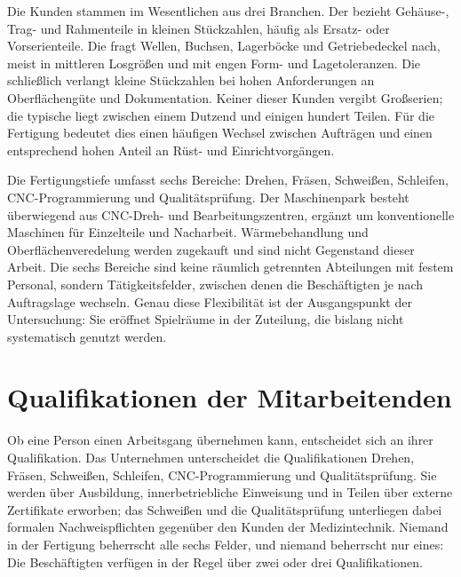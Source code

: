 Die Kunden stammen im Wesentlichen aus drei Branchen. Der 
bezieht Gehäuse-, Trag- und Rahmenteile in kleinen Stückzahlen, häufig als
Ersatz- oder Vorserienteile. Die  fragt Wellen,
Buchsen, Lagerböcke und Getriebedeckel nach, meist in mittleren Losgrößen und
mit engen Form- und Lagetoleranzen. Die  schließlich
verlangt kleine Stückzahlen bei hohen Anforderungen an Oberflächengüte und
Dokumentation. Keiner dieser Kunden vergibt Großserien; die typische
 liegt zwischen einem Dutzend und einigen hundert Teilen. Für
die Fertigung bedeutet dies einen häufigen Wechsel zwischen Aufträgen und
einen entsprechend hohen Anteil an Rüst- und Einrichtvorgängen.

Die Fertigungstiefe umfasst sechs Bereiche: Drehen, Fräsen, Schweißen,
Schleifen, CNC-Programmierung und Qualitätsprüfung. Der Maschinenpark besteht
überwiegend aus CNC-Dreh- und Bearbeitungszentren, ergänzt um konventionelle
Maschinen für Einzelteile und Nacharbeit. Wärmebehandlung und
Oberflächenveredelung werden zugekauft und sind nicht Gegenstand dieser
Arbeit. Die sechs Bereiche sind keine räumlich getrennten Abteilungen mit
festem Personal, sondern Tätigkeitsfelder, zwischen denen die Beschäftigten je
nach Auftragslage wechseln. Genau diese Flexibilität ist der Ausgangspunkt der
Untersuchung: Sie eröffnet Spielräume in der Zuteilung, die bislang nicht
systematisch genutzt werden.

\section{Qualifikationen der Mitarbeitenden}
\label{sec:qualifikationen}

Ob eine Person einen Arbeitsgang übernehmen kann, entscheidet sich an ihrer
Qualifikation. Das Unternehmen unterscheidet die \ZahlQualifikationen{}
Qualifikationen Drehen, Fräsen, Schweißen, Schleifen, CNC-Programmierung und
Qualitätsprüfung. Sie werden über Ausbildung, innerbetriebliche Einweisung und
in Teilen über externe Zertifikate erworben; das Schweißen und die
Qualitätsprüfung unterliegen dabei formalen Nachweispflichten gegenüber den
Kunden der Medizintechnik. Niemand in der Fertigung beherrscht alle sechs
Felder, und niemand beherrscht nur eines: Die Beschäftigten verfügen in der
Regel über zwei oder drei Qualifikationen.

